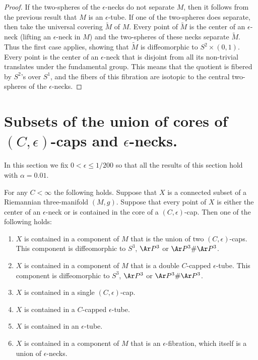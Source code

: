 \begin{proof}
If the two-spheres of the $\epsilon$-necks do not separate $M$, then
it follows from the previous result that $M$ is an $\epsilon$-tube.
If one of the two-spheres does separate, then take the universal
covering $\widetilde M$ of $M$.  Every point of $\widetilde M$ is
the center of an $\epsilon$-neck (lifting an $\epsilon$-neck in $M$)
and the two-spheres of these necks separate $\widetilde M$. Thus the
first case applies, showing that $\widetilde M$ is diffeomorphic to
$S^2\times (0,1)$. Every point is the center of an $\epsilon$-neck
that is disjoint from all its non-trivial translates under the
fundamental group. This means that the quotient is fibered by
$S^2$'s over $S^1$, and the fibers of this fibration are isotopic to
the central two-spheres of the $\epsilon$-necks.
\end{proof}


\section{Subsets of the union of cores of $(C,\epsilon)$-caps
and $\epsilon$-necks.} In this section we fix $0<\epsilon\le 1/200$
so that all the results of this section hold with $\alpha=0.01$.

\begin{proposition}
\label{prop:connected-set-in-caps-and-necks}
\label{Xcontainedin}
For any $C<\infty$ the following holds. Suppose that $X$ is a
connected subset of a Riemannian three-manifold $(M,g)$. Suppose
that every point of $X$ is either the center of an $\epsilon$-neck
or is contained in the core of a $(C,\epsilon)$-cap. Then one of the
following holds:
\begin{enumerate}
\item[(1)] $X$ is contained in a component of $M$ that is the union of
two $(C,\epsilon)$-caps. This component is diffeomorphic to $S^3$,
$\Ar P^3$ or $\Ar P^3\#\Ar P^3$.
\item[(2)] $X$ is contained in a component of $M$ that is a double $C$-capped $\epsilon$-tube.
 This component is diffeomorphic to $S^3$, $\Ar P^3$ or $\Ar
P^3\#\Ar P^3$.
\item[(3)] $X$ is contained in a single $(C,\epsilon)$-cap.
\item[(4)] $X$ is contained in a $C$-capped $\epsilon$-tube.
\item[(5)] $X$ is contained in an $\epsilon$-tube.
\item[(6)] $X$ is contained in a component of $M$ that is an
$\epsilon$-fibration, which itself is a union of $\epsilon$-necks.
\end{enumerate}
\end{proposition}


